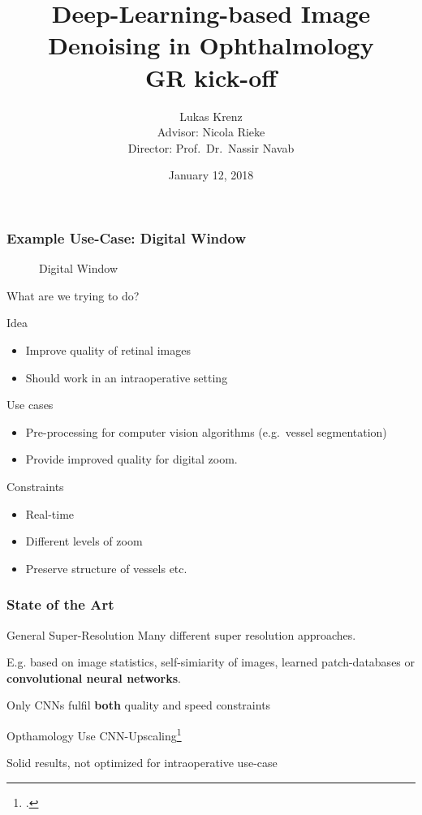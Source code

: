 \documentclass{beamer}
\title{Deep-Learning-based Image Denoising in Ophthalmology\\GR kick-off}
\author{Lukas Krenz\\Advisor: Nicola Rieke\\Director: Prof.\ Dr.\ Nassir Navab}
\date{January 12, 2018}
\institute{TUM, Chair for Computer Aided Medical Procedures \textit{\&} Augmented Reality}
\begin{document}
\maketitle

\begin{frame}
  \frametitle{Example Use-Case: Digital Window}
   \begin{figure}[h]
    \centering
    \caption{Digital Window}
    \label{fig:digital-window}
  \end{figure}
\end{frame}


\begin{frame}{What are we trying to do?}
\begin{block}{Idea}
\begin{itemize}
\item Improve quality of retinal images
\item Should work in an intraoperative setting
\end{itemize}
\end{block}

\begin{block}{Use cases}
\begin{itemize}
\item Pre-processing for computer vision algorithms (e.g.\ vessel segmentation)
\item Provide improved quality for digital zoom.
\end{itemize}
\end{block}

\begin{block}{Constraints}
  \begin{itemize}
  \item Real-time
  \item Different levels of zoom
  \item Preserve structure of vessels etc.
  \end{itemize}
\end{block}
\end{frame}

\begin{frame}
  \frametitle{State of the Art}

\begin{block}{General Super-Resolution}
Many different super resolution approaches.
    
E.g. based on image statistics, self-simiarity of images, learned patch-databases or \textbf{convolutional neural networks}.

Only CNNs fulfil \textbf{both} quality and speed constraints
\end{block}


\begin{block}{Opthamology}
Use CNN-Upscaling\footcite{SaliencyGAN} 

Solid results, not optimized for intraoperative use-case
\end{block}
\end{frame}
\end{document}
